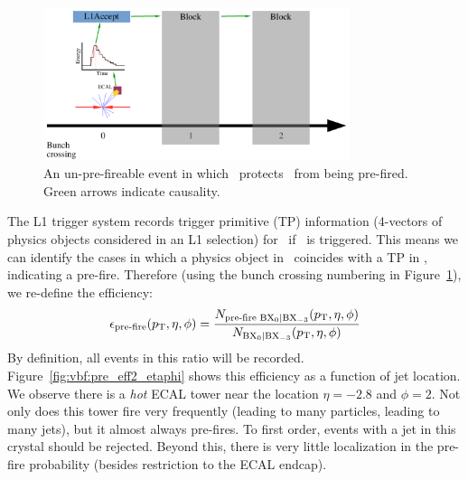 \begin{figure}
    \begin{center}
        \includegraphics[width=0.8\textwidth,page=3]{figures/vbf/triggers/l1diag.pdf}
        \caption{An un-pre-fireable event in which ~protects ~from being pre-fired. 
                 Green arrows indicate causality.}
        \label{fig:vbf:pre3}
    \end{center}
\end{figure}

The L1 trigger system records trigger primitive (TP) information (4-vectors of physics objects considered in an L1 selection) for ~if ~is triggered.
This means we can identify the cases in which a physics object in ~coincides with a TP in , indicating a pre-fire. 
Therefore (using the bunch crossing numbering in Figure~\ref{fig:vbf:pre3}), we re-define the efficiency:
\begin{equation}
    \epsilon_\text{pre-fire}(p_\mathrm{T},\eta,\phi) = \frac{N_\text{pre-fire \ensuremath{{\mathrm{BX}_{0}}}|\ensuremath{{\mathrm{BX}_{-3}}}}(p_\mathrm{T},\eta,\phi)}{N_\text{\ensuremath{{\mathrm{BX}_{0}}}|\ensuremath{{\mathrm{BX}_{-3}}}}(p_\mathrm{T},\eta,\phi)}
\end{equation}
By definition, all events in this ratio will be recorded. 
Figure~\ref{fig:vbf:pre_eff2_etaphi} shows this efficiency as a function of jet location. 
We observe there is a \emph{hot} ECAL tower near the location $\eta=-2.8$ and $\phi=2$.
Not only does this tower fire very frequently (leading to many particles, leading to many jets), but it almost always pre-fires.
To first order, events with a jet in this crystal should be rejected.
Beyond this, there is very little localization in the pre-fire probability (besides restriction to the ECAL endcap). 

